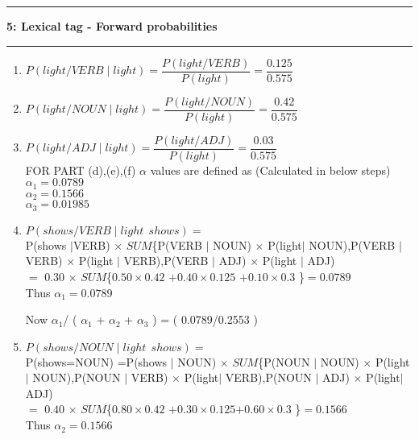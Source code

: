 \documentclass[11pt]{article}
\newcommand\question[2]{\vspace{.25in}\hrule\textbf{#1: #2}\vspace{.5em}\hrule\vspace{.10in}}
\begin{document}
\newpage
\question{5}{Lexical tag - Forward probabilities}
\begin{enumerate}

\item  $P(light/VERB \mid light)=\dfrac{P(light/VERB)}{P(light)}=\dfrac{0.125}{0.575}$  \\

\item  $P(light/NOUN \mid light)=\dfrac{P(light/NOUN)}{P(light)}=\dfrac{0.42}{0.575}$  \\

\item $P(light/ADJ \mid light)=\dfrac{P(light/ADJ)}{P(light)}=\dfrac{0.03}{0.575}$  \\

FOR PART (d),(e),(f) $\alpha$ values are defined as (Calculated in below steps)
\\$\alpha_{1}=0.0789$
\\$\alpha_{2}=0.1566$
\\$\alpha_{3}=0.01985$ 

\item $P(shows/VERB \mid light\ \ shows)=$ \\

P(shows $\mid $VERB) $\times$ $SUM$\{P(VERB $\mid$ NOUN) $\times$ P(light$\mid$ NOUN),\thinspace P(VERB $\mid $ VERB) $\times$ P(light $ \mid $ VERB),\thinspace P(VERB $\mid $ ADJ) $\times$ P(light  $\mid $ ADJ) 
\\$=$ $0.30$ $\times$ $SUM$\{$0.50 \times 0.42$ $ + $\thinspace $0.40 \times 0.125$ $ + $\thinspace$0.10 \times 0.3$ \}$=0.0789$\\

Thus $\alpha_{1}=0.0789$

Now $\alpha_{1}$/ ( $\alpha_{1}$ + $\alpha_{2}$ + $\alpha_{3}$ ) = ( 0.0789/0.2553 )

\item $P(shows/NOUN \mid light\ \ shows)=$ \\

P(shows=NOUN) =P(shows $\mid$ NOUN) $\times$ $SUM$\{P(NOUN $\mid $ NOUN) $\times$ P(light$\mid$ NOUN),\thinspace P(NOUN $\mid$ VERB) $\times$ P(light$ \mid $ VERB),\thinspace P(NOUN $\mid$ ADJ) $\times$ P(light$ \mid $ADJ) 
\\$=$ $0.40$ $\times$ $SUM$\{$0.80 \times 0.42$ $ + $\thinspace $0.30 \times 0.125$$ + $\thinspace$0.60 \times 0.3$ \}$=0.1566$\\

Thus $\alpha_{2}=0.1566$


\end{enumerate}
\end{document}
